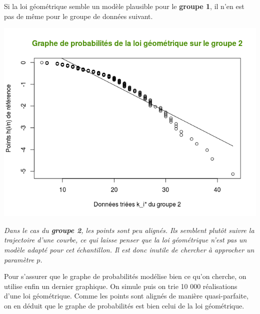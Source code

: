\documentclass[a4paper,11pt]{article}
\theoremstyle{nonumberplain}
\theoremstyle{nonumberplain}
\theoremstyle{nonumberplain}
\theoremstyle{nonumberplain}
\begin{document}
        Si la loi géométrique semble un modèle plausible pour le \textbf{groupe 1}, il n'en
        est pas de même pour le groupe de données suivant.

        \begin{center}
            \includegraphics[scale=0.75]{images/p1_q3_groupe2.png}
        \end{center}

        \vspace{-2ex}
        \begin{commentaire}
            \hspace{-1ex}\emph{Dans le cas du \textbf{groupe 2}, les points sont peu alignés.
            Ils semblent plutôt suivre la trajectoire d'une courbe, ce qui laisse penser que la
            loi géométrique n'est pas un modèle adapté pour cet échantillon. Il est donc inutile
            de chercher à approcher un paramètre $p$.}
        \end{commentaire}

        Pour s'assurer que le graphe de probabilités modélise bien ce qu'on cherche, on
        utilise enfin un dernier graphique. On simule puis on trie 10 000 réalisations d'une loi géométrique.
        Comme les points sont alignés de manière quasi-parfaite, on en
        déduit que le graphe de probabilités est bien celui de la loi géométrique.
\end{document}
